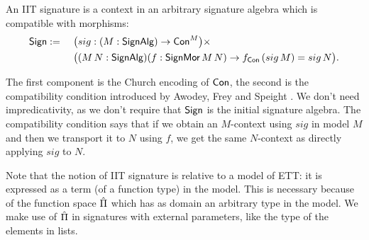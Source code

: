 \documentclass[a4paper,UKenglish,cleveref, autoref]{lipics-v2019}
\begin{document}
\begin{definition}
  An IIT signature is a context in an arbitrary signature algebra
  which is compatible with morphisms:
  \begin{alignat*}{6}
    & \mathsf{Sign} :=\,\, && \big({sig}:(M:\mathsf{SignAlg})\rightarrow\mathsf{Con}^M\big)\times \\
    & && \big((M\,N:\mathsf{SignAlg})(f:\mathsf{SignMor}\,M\,N)\rightarrow f_{\mathsf{Con}}\,({sig}\,M) = {sig}\,N \big).
  \end{alignat*}
\end{definition}
The first component is the Church encoding of $\mathsf{Con}$, the second is
the compatibility condition introduced by Awodey, Frey and Speight
\cite{DBLP:conf/lics/AwodeyFS18}. We don't need impredicativity, as we
don't require that $\mathsf{Sign}$ is the initial signature algebra. The
compatibility condition says that if we obtain an $M$-context using
${sig}$ in model $M$ and then we transport it to $N$ using $f$, we get
the same $N$-context as directly applying ${sig}$ to $N$.

Note that the notion of IIT signature is relative to a model of ETT:
it is expressed as a term (of a function type) in the model. This is
necessary because of the function space $\hat{\Pi}$ which has as domain an
arbitrary type in the model. We make use of $\hat{\Pi}$ in signatures with
external parameters, like the type of the elements in lists.
\end{document}
